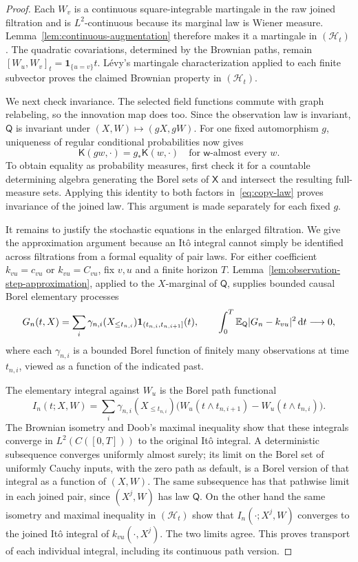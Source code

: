 \begin{proof}
Each $W_v$ is a continuous square-integrable martingale in the raw
joined filtration and is $L^2$-continuous because its marginal law is
Wiener measure. Lemma~\ref{lem:continuous-augmentation} therefore makes
it a martingale in $(\mathcal H_t)$. The quadratic covariations,
determined by the Brownian paths, remain
$[W_u,W_v]_t=\mathbf 1_{\{u=v\}}t$. L\'evy's martingale
characterization applied to each finite subvector proves the claimed
Brownian property in $(\mathcal H_t)$.

We next check invariance. The selected field functions commute with
graph relabeling, so the innovation map does too. Since the observation
law is invariant, $\mathsf Q$ is invariant under
$(X,W)\mapsto(gX,gW)$. For one fixed automorphism $g$, uniqueness of
regular conditional probabilities now gives
\begin{equation}\label{eq:kernel-equivariance}
 \mathsf K(gw,\cdot)=g_*\mathsf K(w,\cdot)
       \quad\text{for $\mathsf w$-almost every }w.
\end{equation}
To obtain equality as probability measures, first check it for a
countable determining algebra generating the Borel sets of $\mathsf X$
and intersect the resulting full-measure sets. Applying this identity
to both factors in~\eqref{eq:copy-law} proves invariance of the
joined law. This argument is made separately for each fixed $g$.

It remains to justify the stochastic equations in the enlarged
filtration. We give the approximation argument because an It\^o
integral cannot simply be identified across filtrations from a
formal equality of pair laws. For either coefficient
$k_{vu}=c_{vu}$ or $k_{vu}=C_{vu}$, fix $v,u$ and a finite horizon
$T$. Lemma~\ref{lem:observation-step-approximation}, applied to the
$X$-marginal of $\mathsf Q$, supplies bounded causal Borel elementary
processes
\[
 G_n(t,X)=\sum_i \gamma_{n,i}(X_{\le t_{n,i}})
       \mathbf 1_{(t_{n,i},t_{n,i+1}]}(t),
 \qquad
 \int_0^T\mathbb E_{\mathsf Q}|G_n-k_{vu}|^2\,\mathrm d t\longrightarrow0,
\]
where each $\gamma_{n,i}$ is a bounded Borel function of finitely many
observations at time $t_{n,i}$, viewed as a function of the indicated
past.

The elementary integral against $W_u$ is the Borel path functional
\[
 I_n(t;X,W)=\sum_i\gamma_{n,i}(X_{\le t_{n,i}})
    \bigl(W_u(t\wedge t_{n,i+1})-W_u(t\wedge t_{n,i})\bigr).
\]
The Brownian isometry and Doob's maximal inequality show that these
integrals converge in $L^2(C([0,T]))$ to the original It\^o integral.
A deterministic subsequence converges uniformly almost surely; its
limit on the Borel set of uniformly Cauchy inputs, with the zero path
as default, is a Borel version of that integral as a function of
$(X,W)$. The same subsequence has that pathwise limit in each joined
pair, since $(X^j,W)$ has law $\mathsf Q$. On the other hand the same
isometry and maximal inequality in $(\mathcal H_t)$ show that
$I_n(\cdot;X^j,W)$ converges to the joined It\^o integral of
$k_{vu}(\cdot,X^j)$. The two limits agree. This proves transport of
each individual integral, including its continuous path version.


\end{proof}
